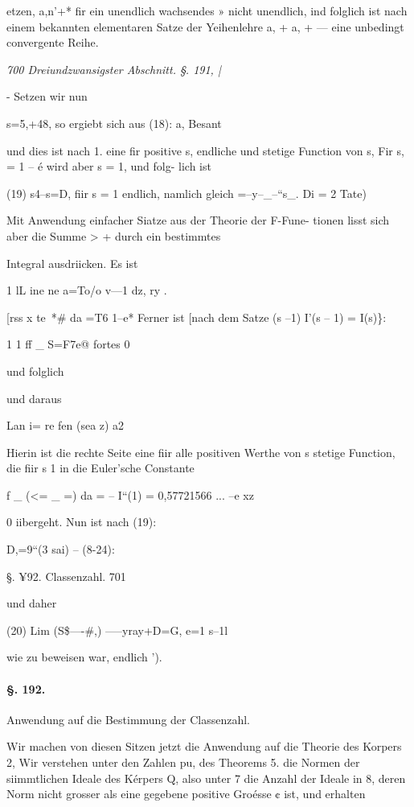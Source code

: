 \documentclass[12pt,a4paper]{article}
\theoremstyle{plain}
\theoremstyle{definition}
\begin{document}
etzen, a,n'+* fir ein unendlich wachsendes » nicht unendlich, ind folglich ist nach einem bekannten elementaren Satze der Yeihenlehre a, + a, + --- eine unbedingt convergente Reihe.

\vspace{0.5\baselineskip}\noindent\textit{700 Dreiundzwansigster Abschnitt. §. 191, |}\par

- Setzen wir nun

s=5,+48, so ergiebt sich aus (18): a, Besant

und dies ist nach 1. eine fir positive s, endliche und stetige Function von s, Fir s, = 1 -- é wird aber s = 1, und folg- lich ist

(19) s4--s=D, fiir s = 1 endlich, namlich gleich =--y--\_--``s\_. Di = 2 Tate)

Mit Anwendung einfacher Siatze aus der Theorie der F-Fune- tionen lisst sich aber die Summe > + durch ein bestimmtes

Integral ausdriicken. Es ist

1 lL ine ne a=To/o v---1 dz, ry .

[rss x te~*\# da =T6 1--e* Ferner ist [nach dem Satze (s --1) I'(s -- 1) = I(s)\}:

1 1 ff \_ S=F7e@ fortes 0

und folglich

und daraus

Lan i= re fen (sea z) a2

Hierin ist die rechte Seite eine fiir alle positiven Werthe von s stetige Function, die fiir s 1 in die Euler'sche Constante

f \_ (<= \_ =) da = -- I``(1) = 0,57721566 ... --e xz

0 iibergeht. Nun ist nach (19):

D,=9``(3 sai) -- (8-24):

§. ¥92. Classenzahl. 701

und daher

(20) Lim (S\$----\#,) -----yray+D=G, e=1 s--1l

wie zu beweisen war, endlich ').

\paragraph{§. 192.}

Anwendung auf die Bestimmung der Classenzahl.

Wir machen von diesen Sitzen jetzt die Anwendung auf die Theorie des Korpers 2, Wir verstehen unter den Zahlen pu, des Theorems 5. die Normen der siimmtlichen Ideale des Kérpers Q, also unter 7 die Anzahl der Ideale in 8, deren Norm nicht grosser als eine gegebene positive Groésse ¢ ist, und erhalten
\end{document}
